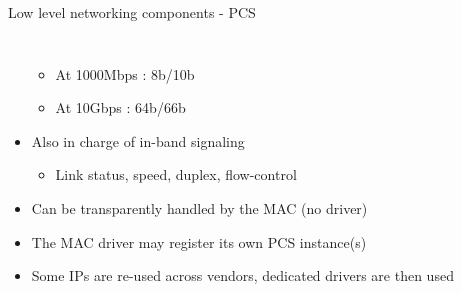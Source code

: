 \begin{frame}{Low level networking components - PCS}
\begin{columns}
\begin{itemize}
\begin{itemize}
					\item At 1000Mbps : 8b/10b
					\item At 10Gbps : 64b/66b
				\end{itemize}
			\item Also in charge of in-band signaling
				\begin{itemize}
					\item Link status, speed, duplex, flow-control
				\end{itemize}
			\item Can be transparently handled by the MAC (no driver)
			\item The MAC driver may register its own PCS instance(s)
			\item Some IPs are re-used across vendors, dedicated drivers are then used
		\end{itemize}
	\end{columns}
\end{frame}

